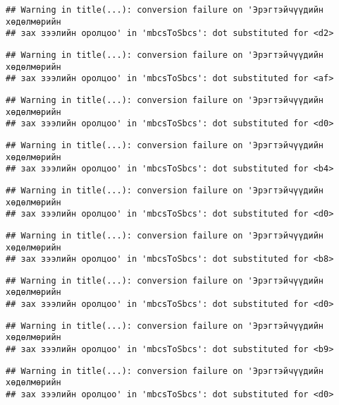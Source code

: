 \documentclass[]{article}
\begin{document}
\begin{verbatim}
## Warning in title(...): conversion failure on 'Эрэгтэйчүүдийн хөдөлмөрийн
## зах зээлийн оролцоо' in 'mbcsToSbcs': dot substituted for <d2>
\end{verbatim}

\begin{verbatim}
## Warning in title(...): conversion failure on 'Эрэгтэйчүүдийн хөдөлмөрийн
## зах зээлийн оролцоо' in 'mbcsToSbcs': dot substituted for <af>
\end{verbatim}

\begin{verbatim}
## Warning in title(...): conversion failure on 'Эрэгтэйчүүдийн хөдөлмөрийн
## зах зээлийн оролцоо' in 'mbcsToSbcs': dot substituted for <d0>
\end{verbatim}

\begin{verbatim}
## Warning in title(...): conversion failure on 'Эрэгтэйчүүдийн хөдөлмөрийн
## зах зээлийн оролцоо' in 'mbcsToSbcs': dot substituted for <b4>
\end{verbatim}

\begin{verbatim}
## Warning in title(...): conversion failure on 'Эрэгтэйчүүдийн хөдөлмөрийн
## зах зээлийн оролцоо' in 'mbcsToSbcs': dot substituted for <d0>
\end{verbatim}

\begin{verbatim}
## Warning in title(...): conversion failure on 'Эрэгтэйчүүдийн хөдөлмөрийн
## зах зээлийн оролцоо' in 'mbcsToSbcs': dot substituted for <b8>
\end{verbatim}

\begin{verbatim}
## Warning in title(...): conversion failure on 'Эрэгтэйчүүдийн хөдөлмөрийн
## зах зээлийн оролцоо' in 'mbcsToSbcs': dot substituted for <d0>
\end{verbatim}

\begin{verbatim}
## Warning in title(...): conversion failure on 'Эрэгтэйчүүдийн хөдөлмөрийн
## зах зээлийн оролцоо' in 'mbcsToSbcs': dot substituted for <b9>
\end{verbatim}

\begin{verbatim}
## Warning in title(...): conversion failure on 'Эрэгтэйчүүдийн хөдөлмөрийн
## зах зээлийн оролцоо' in 'mbcsToSbcs': dot substituted for <d0>
\end{verbatim}
\end{document}
